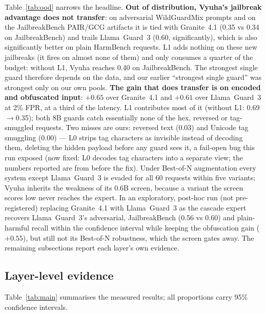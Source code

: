 \documentclass[11pt]{article}
\begin{document}
Table~\ref{tab:ood} narrows the headline. \textbf{Out of distribution, Vyuha's jailbreak advantage does not
transfer}: on adversarial WildGuardMix prompts and on the JailbreakBench PAIR/GCG artifacts it is tied with
Granite~4.1 (0.35 vs 0.34 on JailbreakBench) and trails Llama~Guard~3 (0.60, significantly), which is also
significantly better on plain HarmBench requests. L1 adds nothing on these new jailbreaks (it fires on
almost none of them) and only consumes a quarter of the budget: without L1, Vyuha reaches 0.40 on
JailbreakBench. The strongest single guard therefore depends on
the data, and our earlier ``strongest single guard'' was strongest only on our own pools.
\textbf{The gain that does transfer is on encoded and obfuscated input}: $+0.65$ over Granite~4.1 and
$+0.61$ over Llama~Guard~3 at 2\% FPR, at a third of the latency. L1 contributes most of it (without L1:
0.69$\rightarrow$0.35); both 8B guards catch essentially none of the hex, reversed or tag-smuggled
requests. Two misses are ours: reversed text (0.03) and Unicode tag smuggling (0.00) --- L0 strips tag
characters as invisible instead of decoding them, deleting the hidden payload before any guard sees it, a
fail-open bug this run exposed (now fixed: L0 decodes tag characters into a separate view; the numbers
reported are from before the fix). Under Best-of-N augmentation every system except Llama~Guard~3 is evaded
for all 60 requests within five variants; Vyuha inherits the weakness of its 0.6B screen, because a variant
the screen scores low never reaches the expert. In an exploratory, post-hoc run (not pre-registered)
replacing Granite~4.1 with Llama~Guard~3 as the cascade expert recovers Llama~Guard~3's adversarial, JailbreakBench (0.56 vs 0.60) and
plain-harmful recall within the confidence interval while keeping the obfuscation gain ($+0.55$), but
still not its Best-of-N robustness, which the screen gates away. The remaining subsections report each
layer's own evidence.

\subsection{Layer-level evidence}
Table~\ref{tab:main} summarises the measured results; all proportions carry 95\% confidence intervals.
\end{document}
